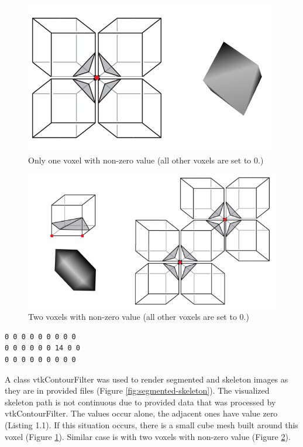 \begin{figure}
	\centering
	\includegraphics[scale=0.6]{fig/marching-cubes-1-point}
	\caption{Only one voxel with non-zero value (all other voxels are set to 0.)}
	\label{fig:marching-cubes-1-point}
\end{figure}

\begin{figure}
	\centering
	\includegraphics[scale=0.6]{fig/marching-cubes-2-points}
	\caption{Two voxels with non-zero value (all other voxels are set to 0.)}
	\label{fig:marching-cubes-2-points}
\end{figure}

\begin{lstlisting}[caption={A sample from skeleton file},label={lst:sample-skeleton}]
0 0 0 0 0 0 0 0 0 
0 0 0 0 0 0 14 0 0 
0 0 0 0 0 0 0 0 0 
\end{lstlisting}

A class vtkContourFilter was used to render segmented and skeleton images as they are in provided files (Figure \ref{fig:segmented-skeleton}).
The visualized skeleton path is not continuous due to provided data that was processed by vtkContourFilter. The values occur alone, the adjacent ones have value zero (Listing 1.1). If this situation occurs, there is a small cube mesh built around this voxel (Figure \ref{fig:marching-cubes-1-point}). Similar case is with two voxels with non-zero value (Figure \ref{fig:marching-cubes-2-points}).

